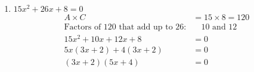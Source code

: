 \documentclass[12pt]{article}
\begin{document}
\begin{enumerate}
\begin{enumerate}
        \item $15x^2 + 26x + 8 = 0$
        \begin{align*}
            A \times C & = 15 \times 8 = 120 \\
            \text{Factors of 120 that add up to 26:} & \quad 10 \text{ and } 12 \\
            15x^2 + 10x + 12x + 8 &= 0 \\
            5x(3x + 2) + 4(3x + 2) &= 0 \\
            (3x + 2)(5x + 4) &= 0
        \end{align*}
    \end{enumerate}
\end{enumerate}
\end{document}
